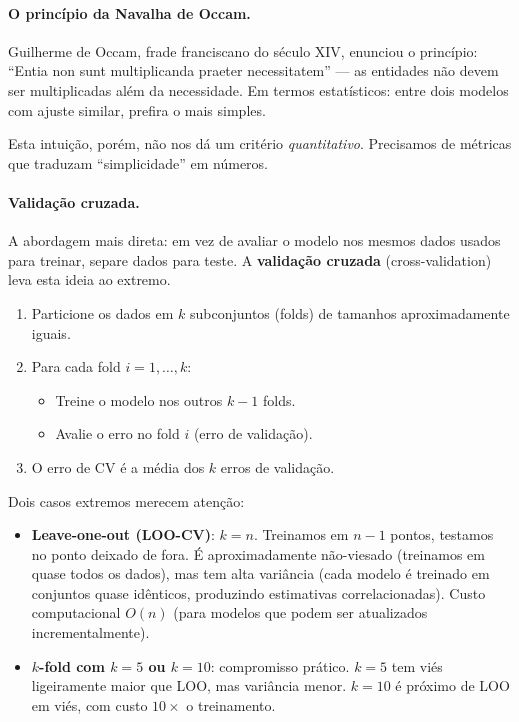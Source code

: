 \documentclass{tufte-handout}
\begin{document}
\paragraph{O princípio da Navalha de Occam.}

Guilherme de Occam, frade franciscano do século XIV, enunciou o princípio: ``Entia non sunt multiplicanda praeter necessitatem'' --- as entidades não devem ser multiplicadas além da necessidade. Em termos estatísticos: entre dois modelos com ajuste similar, prefira o mais simples.

Esta intuição, porém, não nos dá um critério \textit{quantitativo}. Precisamos de métricas que traduzam ``simplicidade'' em números.

\paragraph{Validação cruzada.}

A abordagem mais direta: em vez de avaliar o modelo nos mesmos dados usados para treinar, separe dados para teste. A \textbf{validação cruzada} (cross-validation) leva esta ideia ao extremo.

\begin{defn}
    \hfill
    \begin{enumerate}
        \item Particione os dados em $k$ subconjuntos (folds) de tamanhos aproximadamente iguais.
        \item Para cada fold $i = 1, \dots, k$:
        \begin{itemize}
            \item Treine o modelo nos outros $k-1$ folds.
            \item Avalie o erro no fold $i$ (erro de validação).
        \end{itemize}
        \item O erro de CV é a média dos $k$ erros de validação.
    \end{enumerate}
\end{defn}

Dois casos extremos merecem atenção:

\begin{itemize}
    \item \textbf{Leave-one-out (LOO-CV)}: $k = n$. Treinamos em $n-1$ pontos, testamos no ponto deixado de fora. É aproximadamente não-viesado (treinamos em quase todos os dados), mas tem alta variância (cada modelo é treinado em conjuntos quase idênticos, produzindo estimativas correlacionadas). Custo computacional $O(n)$ (para modelos que podem ser atualizados incrementalmente).

    \item \textbf{$k$-fold com $k=5$ ou $k=10$}: compromisso prático. $k=5$ tem viés ligeiramente maior que LOO, mas variância menor. $k=10$ é próximo de LOO em viés, com custo $10\times$ o treinamento.
\end{itemize}
\end{document}
